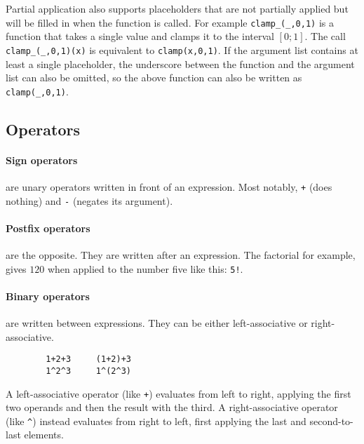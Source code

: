 \documentclass[10pt]{article}
\begin{document}
    Partial application also supports placeholders that are not partially applied but will be filled in when the function is called.
    For example \verb|clamp_(_,0,1)| is a function that takes a single value and clamps it to the interval $ [0;1] $.
    The call \verb|clamp_(_,0,1)(x)| is equivalent to \verb|clamp(x,0,1)|.
    If the argument list contains at least a single placeholder, the underscore between the function and the argument list can also be omitted, so the above function can also be written as \verb|clamp(_,0,1)|.
    
    \subsection{Operators}\label{subsec:sign-operators}
    \paragraph{Sign operators} are unary operators written in front of an expression.
    Most notably, \verb|+| {\small(does nothing)} and \verb|-| {\small(negates its argument)}.

    \paragraph{Postfix operators} are the opposite.
    They are written after an expression.
    The factorial for example, gives $ 120 $ when applied to the number five like this: \verb|5!|.
    
    \paragraph{Binary operators} are written between expressions.
    They can be either left-associative or right-associative.
    \begin{verbatim}
        1+2+3     (1+2)+3
        1^2^3     1^(2^3)
    \end{verbatim}
    A left-associative operator {\small(like \verb|+|)} evaluates from left to right, applying the first two operands and then the result with the third.
    A right-associative operator {\small(like \verb|^|)} instead evaluates from right to left, first applying the last and second-to-last elements.
\end{document}
